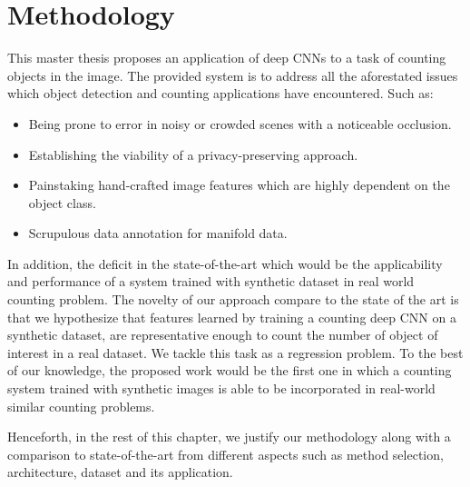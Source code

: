 \newpage
\chapter{Methodology}
\label{sec:proposal}
\noindent
This master thesis proposes an application of deep CNNs to a task of counting objects in the image. The provided system is to address all the aforestated issues which object detection and counting applications have encountered. Such as:
\begin{itemize}
	\item Being prone to error in noisy or crowded scenes with a noticeable occlusion. 
	\item Establishing the viability of a privacy-preserving approach. 
	\item Painstaking hand-crafted image features which are highly dependent on the object class. 
	\item Scrupulous data annotation for manifold data. 
\end{itemize} 
In addition, the deficit in the state-of-the-art \cite{segui2015learning} which would be the applicability and performance of a system trained with synthetic dataset in real world counting problem\cite{chan2008privacy}. The novelty of our approach compare to the state of the art is that we hypothesize that features learned by training a counting deep CNN on a synthetic dataset, are representative enough to count the number of object of interest in a real dataset. We tackle this task as a regression problem. 
To the best of our knowledge, the proposed work would be the first one in which a counting system trained with synthetic images is able to be incorporated in real-world similar counting problems.

Henceforth, in the rest of this chapter, we justify our methodology along with a comparison to state-of-the-art from different aspects such as method selection, architecture, dataset and its application.   



